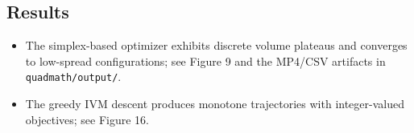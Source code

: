 \documentclass[
  10pt,
]{article}
\newcommand{\passthrough}[1]{#1}
\providecommand{\tightlist}{%
  \setlength{\itemsep}{0pt}\setlength{\parskip}{0pt}}
\begin{document}
\hypertarget{results}{%
\subsection{Results}\label{results}}

\begin{itemize}
\tightlist
\item
  The simplex-based optimizer exhibits discrete volume plateaus and
  converges to low-spread configurations; see Figure 9 and the MP4/CSV
  artifacts in \passthrough{\lstinline!quadmath/output/!}.
\item
  The greedy IVM descent produces monotone trajectories with
  integer-valued objectives; see Figure 16.
\end{itemize}
\end{document}
